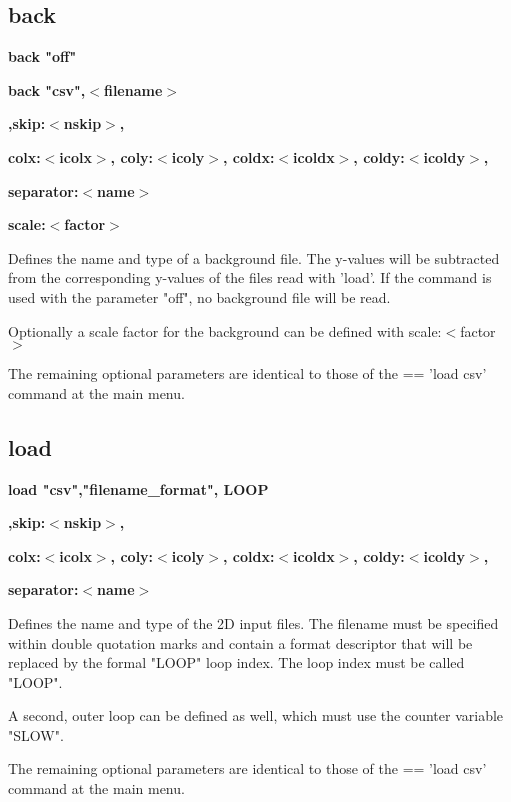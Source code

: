 \subsection*{back}
{\bf back "off" \par }
{\bf back "csv",$ <$filename$> $ \par }
{\bf         ,skip:$ <$nskip$> $, \par }
{\bf         colx:$ <$icolx$> $, coly:$ <$icoly$> $, coldx:$ <$icoldx$> $, coldy:$ <$icoldy$> $, \par }
{\bf         separator:$ <$name$> $ \par }
{\bf         scale:$ <$factor$> $ \par }
\par
\vspace{3pt}
Defines the name and type of a background file. 
The y-values will be subtracted from the corresponding 
y-values of the files read with 'load'. 
If the command is used with the parameter "off", no 
background file will be read. 
\par
Optionally a scale factor for the background can be 
defined with 
scale:$ <$factor$> $ 
\par
The remaining optional parameters are identical to those 
of the == 'load csv' command at the main menu. 
\subsection*{load}
{\bf load "csv","filename\_format", LOOP \par }
{\bf         ,skip:$ <$nskip$> $, \par }
{\bf         colx:$ <$icolx$> $, coly:$ <$icoly$> $, coldx:$ <$icoldx$> $, coldy:$ <$icoldy$> $, \par }
{\bf         separator:$ <$name$> $ \par }
\par
\vspace{3pt}
Defines the name and type of the 2D input files. 
The filename must be specified within double quotation marks 
and contain a format descriptor that will be replaced by the 
formal "LOOP" loop index. The loop index must be called "LOOP". 
\par
A second, outer loop can be defined as well, which must use 
the counter variable "SLOW". 
\par
The remaining optional parameters are identical to those 
of the == 'load csv' command at the main menu. 
